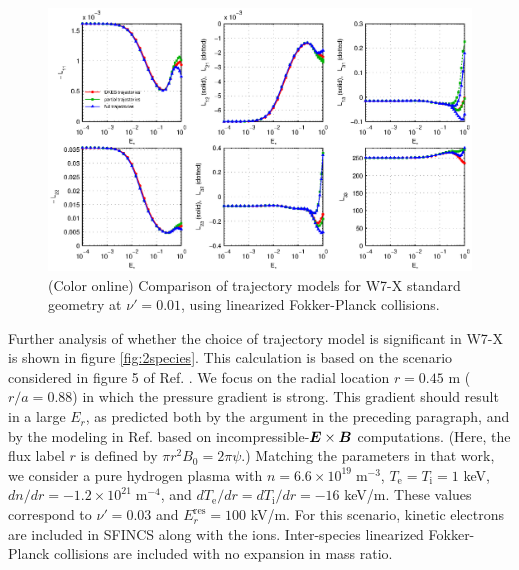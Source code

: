 \documentclass[12pt]{revtex4}
\newcommand{\vect}[1]{\mbox{\boldmath $#1$}}
\newcommand{\Ti}{T_{\mathrm{i}}}
\newcommand{\Te}{T_{\mathrm{e}}}
\newcommand{\Erres}{E_r^{\mathrm{res}}}
\begin{document}
\begin{figure}[h!]
\includegraphics{m20131205_05_plotSFINCSFortranErComparisonForPaper_W7X.eps}
\caption{(Color online) Comparison of trajectory models for W7-X standard geometry at $\nu' = 0.01$,
using linearized Fokker-Planck collisions.
\label{fig:ErComparison_W7X}}
\end{figure}



Further analysis of whether the choice of trajectory model is significant in W7-X
is shown in figure  \ref{fig:2species}.
This calculation is based on the scenario considered in figure 5 of Ref. \cite{Turkin}. 
We focus on the radial location $r=0.45$ m ($r/a=0.88$)
in which the pressure gradient is strong.  This gradient should result in a large $E_r$, as predicted 
both by the argument in the preceding paragraph, and by
the modeling in Ref. \cite{Turkin} based on incompressible-$\vect{E}\times\vect{B}$ computations.
(Here, the flux label $r$ is defined by $\pi r^2 B_0 = 2 \pi \psi$.)
Matching the parameters in that work, we consider a pure hydrogen plasma with $n=6.6\times 10^{19}\; \mathrm{m}^{-3}$,
$\Te=\Ti=1$ keV, $dn/dr = -1.2\times 10^{21} \;\mathrm{m}^{-4}$, and $d\Te/dr=d\Ti/dr = -16$ keV/m.
These values correspond to $\nu'=0.03$ and $\Erres = 100 $ kV/m.
For this scenario, kinetic electrons are included in SFINCS along with the ions.
Inter-species linearized Fokker-Planck collisions are included with no expansion in mass ratio.
\end{document}
